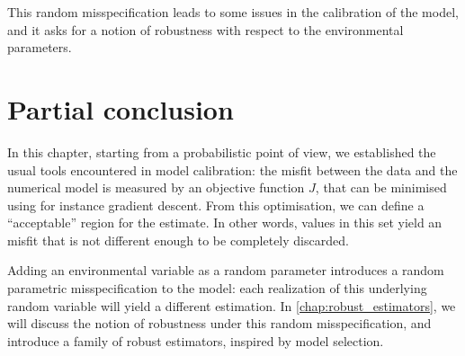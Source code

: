 \documentclass[../../Main_ManuscritThese.tex]{subfiles}
\begin{document}
This random misspecification leads to some issues in the calibration
of the model, and it asks for a notion of robustness with respect to
the environmental parameters.

\section{Partial conclusion}
\label{sec:chap2_partial}

In this chapter, starting from a probabilistic point of view, we
established the usual tools encountered in model calibration: the
misfit between the data and the numerical model is measured by an
objective function $J$, that can be minimised using for instance
gradient descent. From this optimisation, we can define a
``acceptable'' region for the estimate. In other words, values in this
set yield an misfit that is not different enough to be completely
discarded.

Adding an environmental variable as a random parameter introduces a
random parametric misspecification to the model: each realization of
this underlying random variable will yield a different estimation. In
\cref{chap:robust_estimators}, we will discuss the notion of
robustness under this random misspecification, and introduce a family
of robust estimators, inspired by model selection.

\markchapterend


\subfileLocal{
	\pagestyle{empty}
	
	
}
\end{document}
